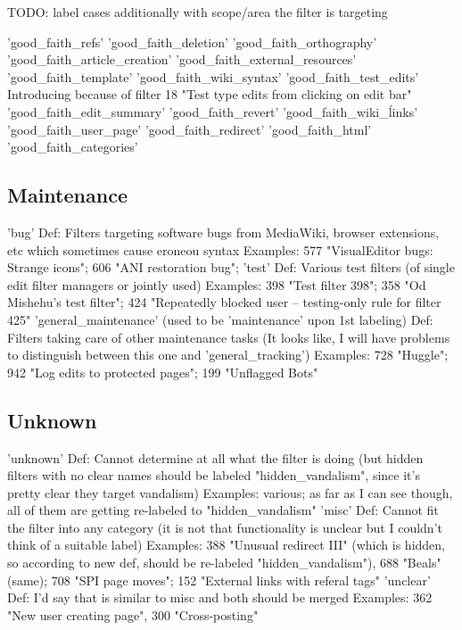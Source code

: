 TODO: label cases additionally with scope/area the filter is targeting

'good\_faith\_refs'
'good\_faith\_deletion'
'good\_faith\_orthography'
'good\_faith\_article\_creation'
'good\_faith\_external\_resources'
'good\_faith\_template'
'good\_faith\_wiki\_syntax'
'good\_faith\_test\_edits'
Introducing because of filter 18 "Test type edits from clicking on edit bar"
'good\_faith\_edit\_summary'
'good\_faith\_revert'
'good\_faith\_wiki\_ĺinks'
'good\_faith\_user\_page'
'good\_faith\_redirect'
'good\_faith\_html'
'good\_faith\_categories'


\subsection{Maintenance}

'bug'
  Def: Filters targeting software bugs from MediaWiki, browser extensions, etc which sometimes cause eroneou syntax
  Examples: 577 "VisualEditor bugs: Strange icons"; 606 "ANI restoration bug";
'test'
  Def: Various test filters (of single edit filter managers or jointly used)
  Examples: 398 "Test filter 398"; 358 "Od Mishehu's test filter"; 424 "Repeatedly blocked user --  testing-only rule for filter 425"
'general\_maintenance' (used to be 'maintenance' upon 1st labeling)
  Def: Filters taking care of other maintenance tasks (It looks like, I will have problems to distinguish between this one and 'general\_tracking')
  Examples: 728 "Huggle"; 942 "Log edits to protected pages"; 199 "Unflagged Bots"

\subsection{Unknown}

'unknown'
  Def: Cannot determine at all what the filter is doing (but hidden filters with no clear names should be labeled "hidden\_vandalism", since it's pretty clear they target vandalism)
  Examples: various; as far as I can see though, all of them are getting re-labeled to "hidden\_vandalism"
'misc'
  Def: Cannot fit the filter into any category (it is not that functionality is unclear but I couldn't think of a suitable label)
  Examples: 388 "Unusual redirect III" (which is hidden, so according to new def, should be re-labeled "hidden\_vandalism"), 688 "Beals" (same); 708 "SPI page moves"; 152 "External links with referal tags"
'unclear'
  Def: I'd say that is similar to misc and both should be merged
  Examples: 362 "New user creating page", 300 "Cross-posting"

